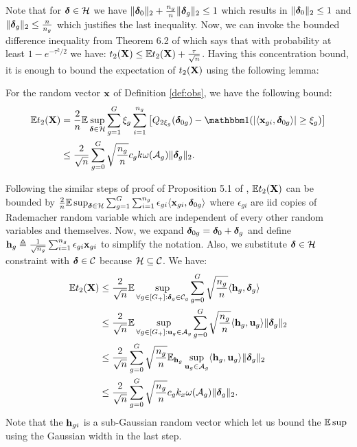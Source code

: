 Note that for $\ddelta \in \cH$ we have $\|\boldsymbol{\delta}_0\|_{2} + \frac{n_g}{n}\|\boldsymbol{\delta}_g\|_{2} \leq 1$ which results in $\|\boldsymbol{\delta}_0\|_{2} \leq 1$ and $\|\boldsymbol{\delta}_g\|_{2} \leq \frac{n}{n_g}$ which justifies the last inequality. 
Now, we can invoke the bounded difference inequality from Theorem 6.2 of \cite{boucheron13} which says that with probability at least $1 - e^{-\tau^2/2}$ we have: $t_2(\mathbf{X}) \leq \mathbb{E} t_2(\mathbf{X}) + \frac{\tau}{\sqrt{n}}$. 
Having this concentration bound, it is enough to bound the expectation of $t_2(\mathbf{X})$ using the following lemma:
\begin{lemma}
	\label{lemm:secTerm}
	For the random vector $\mathbf{x}$ of Definition \ref{def:obs}, we have the following bound:
	{\small\begin{align}	
	\nr 
	\ex t_2(\X) &= \frac{2}{n} \ex \sup_{\ddelta \in \cH} \sum_{g=1}^{G} \xi_g \sum_{i=1}^{n_g} \left[Q_{2 \xi_g}(\ddelta_{0g})  - \indic (|\langle \x_{gi}, \ddelta_{0g} \rangle| \geq \xi_g )  \right]
	\\ \nr 
	&\leq \frac{2}{\sqrt{n}} \sum_{g=0}^{G}  \sqrt{\frac{n_g}{n}} c_g k \omega(\cA_g) \norm{\ddelta_{g}}{2}.
	\end{align}}
\end{lemma}
\begin{IEEEproof}
	Following the similar steps of proof of Proposition 5.1 of \cite{trop15}, $\mathbb{E} t_2(\mathbf{X})$ can be bounded by $\frac{2}{n} \ex \sup_{\ddelta \in \cH} \sum_{g=1}^{G} \sum_{i=1}^{n_g} \epsilon_{gi} \langle \x_{gi}, \ddelta_{0g} \rangle$ where $\epsilon_{gi}$ are iid copies of Rademacher random variable which are independent of every other random variables and themselves. Now, we expand $\boldsymbol{\delta}_{0g} = \boldsymbol{\delta}_{0} + \boldsymbol{\delta}_{g}$ and define $\mathbf{h}_{g} \triangleq \frac{1}{\sqrt{n_g}} \sum_{i=1}^{n_g} \epsilon_{gi} \mathbf{x}_{gi}$ to simplify the notation. Also, we substitute $\ddelta \in \cH$ constraint with $\ddelta \in \cC$ because $\cH \subseteq \cC$. We have:
	\begin{align} \nr 
		\ex t_2(\X) &\leq \frac{2}{\sqrt{n}} \ex \sup_{\forall g \in [G_+]: \ddelta_g \in \cC_g} \sum_{g=0}^{G}  \sqrt{\frac{n_g}{n}}  \langle \h_{g}, \ddelta_{g} \rangle
		\\ \nr 
		&\leq \frac{2}{\sqrt{n}} \ex \sup_{\forall g \in [G_+]: \u_g \in \cA_{g}} \sum_{g=0}^{G}  \sqrt{\frac{n_g}{n}} \langle \h_{g}, \u_{g} \rangle \norm{\ddelta_{g}}{2}
		\\ \nr 
		&\leq \frac{2}{\sqrt{n}} \sum_{g=0}^{G}  \sqrt{\frac{n_g}{n}} \ex_{\h_{g}} \sup_{\u_g \in \cA_g}  \langle \h_{g}, \u_{g} \rangle \norm{\ddelta_{g}}{2}
		\\ \nr 
		&\leq \frac{2}{\sqrt{n}} \sum_{g=0}^{G}  \sqrt{\frac{n_g}{n}} c_g k_x \omega(\cA_g) \norm{\ddelta_{g}}{2}.
	\end{align}
	Note that the $\mathbf{h}_{gi}$ is a sub-Gaussian random vector which let us bound the $\mathbb{E} \sup$ using the Gaussian width \cite{trop15} in the last step. 
\end{IEEEproof}

